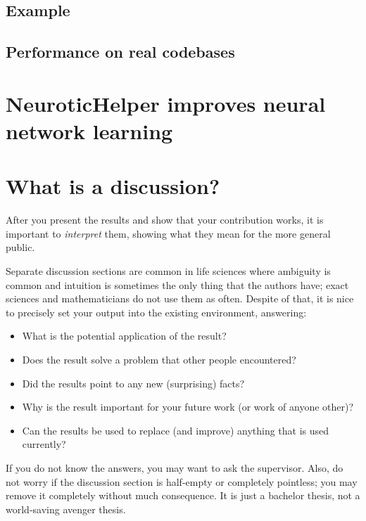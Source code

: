 \subsection{Example}
\subsection{Performance on real codebases}
\section{NeuroticHelper improves neural network learning}

\section{What is a discussion?}
After you present the results and show that your contribution works, it is important to \emph{interpret} them, showing what they mean for the more general public.

Separate discussion sections are common in life sciences where ambiguity is common and intuition is sometimes the only thing that the authors have; exact sciences and mathematicians do not use them as often. Despite of that, it is nice to precisely set your output into the existing environment, answering:
\begin{itemize}
\item What is the potential application of the result?
\item Does the result solve a problem that other people encountered?
\item Did the results point to any new (surprising) facts?
\item Why is the result important for your future work (or work of anyone other)?
\item Can the results be used to replace (and improve) anything that is used currently?
\end{itemize}

If you do not know the answers, you may want to ask the supervisor. Also, do not worry if the discussion section is half-empty or completely pointless; you may remove it completely without much consequence. It is just a bachelor thesis, not a world-saving avenger thesis.
